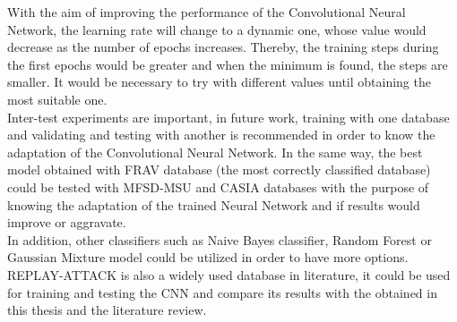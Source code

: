 With the aim of improving the performance of the Convolutional Neural Network, the learning rate will change to a dynamic one, whose value would decrease as the number of epochs increases. Thereby, the training steps during the first epochs would be greater and when the minimum is found, the steps are smaller. It would be necessary to try with different values until obtaining the most suitable one.\\

Inter-test experiments are important, in future work, training with one database and validating and testing with another is recommended in order to know the adaptation of the Convolutional Neural Network. In the same way, the best model obtained with FRAV database (the most correctly classified database) could be tested with MFSD-MSU and CASIA databases with the purpose of knowing the adaptation of the trained Neural Network and if results would improve or aggravate.\\

In addition, other classifiers such as Naive Bayes classifier, Random Forest or Gaussian Mixture model could be utilized in order to have more options.\\

REPLAY-ATTACK is also a widely used database in literature, it could be used for training and testing the CNN and compare its results with the obtained in this thesis and the literature review.
